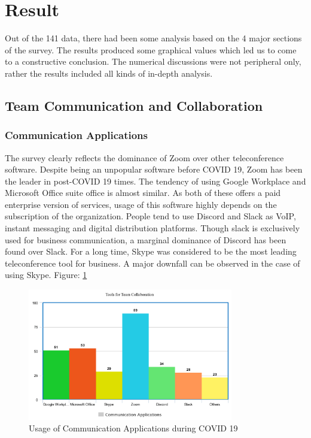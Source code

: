 \documentclass[11pt]{article}
\begin{document}
\section{Result}
Out of the 141 data, there had been some analysis based on the 4 major sections of the survey. The results produced some graphical values which led us to come to a constructive conclusion. The numerical discussions were not peripheral only, rather the results included all kinds of in-depth analysis.  

\subsection {Team Communication and Collaboration}
\subsubsection{Communication Applications}
The survey clearly reflects the dominance of Zoom over other teleconference software. Despite being an unpopular software before COVID 19, Zoom has been the leader in post-COVID 19 times. The tendency of using Google Workplace and Microsoft Office suite office is almost similar. As both of these offers a paid enterprise version of services, usage of this software highly depends on the subscription of the organization. People tend to use Discord and Slack as VoIP, instant messaging and digital distribution platforms. Though slack is exclusively used for business communication, a marginal dominance of Discord has been found over Slack. For a long time, Skype was considered to be the most leading teleconference tool for business. A major downfall can be observed in the case of using Skype. Figure: \ref{fig: Communication Applications}

\begin{figure}[!ht]
	\centering
	\includegraphics[width=0.8\textwidth]{Images/Collaboration/Communication Tool.png}
	\caption{Usage of Communication Applications during COVID 19}
	\centering
	\label{fig: Communication Applications}
\end{figure}
\end{document}
